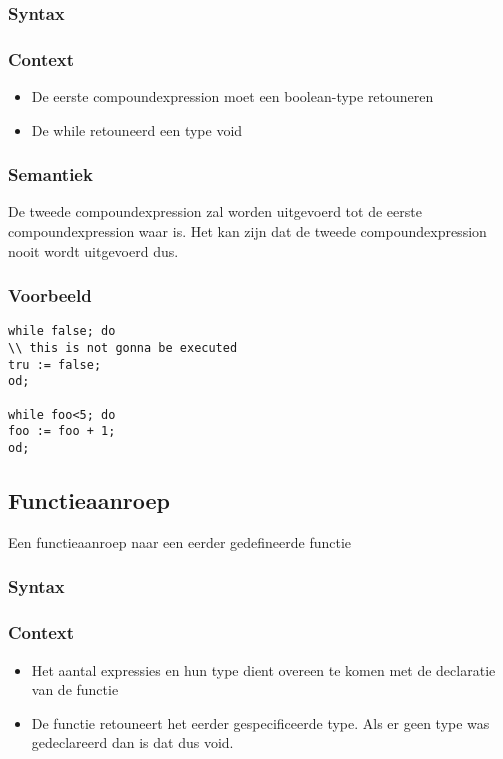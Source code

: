 \documentclass[]{article}
\begin{document}
\subsubsection{Syntax}

\subsubsection{Context}
\begin{itemize}
\item De eerste compoundexpression moet een boolean-type retouneren
\item De while retouneerd een type void
\end{itemize}
\subsubsection{Semantiek}
De tweede compoundexpression zal worden uitgevoerd tot de eerste compoundexpression waar is. Het kan zijn dat de tweede compoundexpression nooit wordt uitgevoerd dus.
\subsubsection{Voorbeeld}
\begin{lstlisting}[style=SELMA]
while false; do 
\\ this is not gonna be executed
tru := false;
od;

while foo<5; do
foo := foo + 1;
od;
\end{lstlisting}

\subsection{Functieaanroep}
Een functieaanroep naar een eerder gedefineerde functie
\subsubsection{Syntax}

\subsubsection{Context}
\begin{itemize}
\item Het aantal expressies en hun type dient overeen te komen met de declaratie van de functie
\item De functie retouneert het eerder gespecificeerde type. Als er geen type was gedeclareerd dan is dat dus void.
\end{itemize}
\end{document}
